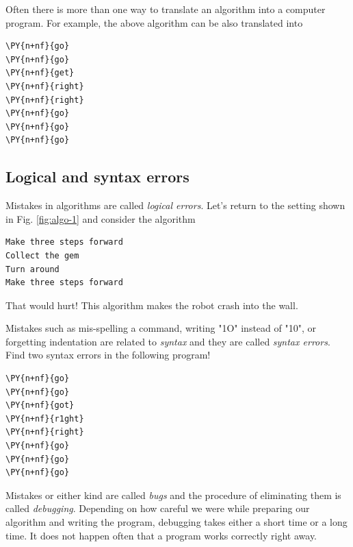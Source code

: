 \noindent
Often there is more than one way to translate an algorithm into a computer 
program. For example, the above algorithm can be also translated into\\

\begin{bbox}
\begin{Verbatim}[commandchars=\\\{\}]
\PY{n+nf}{go}
\PY{n+nf}{go}
\PY{n+nf}{get}
\PY{n+nf}{right}
\PY{n+nf}{right}
\PY{n+nf}{go}
\PY{n+nf}{go}
\PY{n+nf}{go}
\end{Verbatim}
\end{bbox}

\subsection*{Logical and syntax errors}

Mistakes in algorithms are called {\em logical errors}. Let's return to 
the setting shown in Fig. \ref{fig:algo-1} and consider the algorithm

\begin{verbatim}
Make three steps forward
Collect the gem
Turn around
Make three steps forward
\end{verbatim}
That would hurt! This algorithm makes the robot crash into the wall. 

Mistakes such as mis-spelling a command, writing "1O" instead of "10", or forgetting 
indentation are related to {\em syntax} and they are called {\em syntax errors}. Find
two syntax errors in the following program!\\

\begin{bbox}
\begin{Verbatim}[commandchars=\\\{\}]
\PY{n+nf}{go}
\PY{n+nf}{go}
\PY{n+nf}{got}
\PY{n+nf}{r1ght}
\PY{n+nf}{right}
\PY{n+nf}{go}
\PY{n+nf}{go}
\PY{n+nf}{go}
\end{Verbatim}
\end{bbox}
\vspace{6mm}

\noindent
Mistakes or either kind are called {\em bugs} and the procedure of 
eliminating them is called {\em debugging}. Depending on how careful we 
were while preparing our algorithm and writing the program, debugging takes either 
a short time or a long time. It does not happen often that a program works correctly
right away. \\

